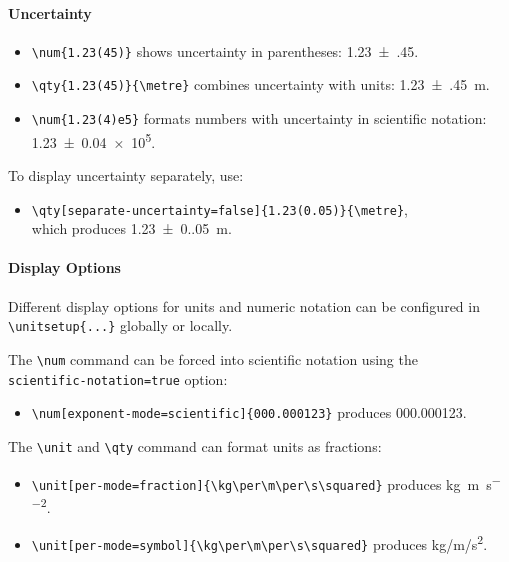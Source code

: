     \paragraph*{Uncertainty}

    \begin{itemize}
        \item \verb|\num{1.23(45)}| shows uncertainty in parentheses: \num{1.23(45)}.
        \item \verb|\qty{1.23(45)}{\metre}| combines uncertainty with units: \qty{1.23(45)}{\metre}.
        \item \verb|\num{1.23(4)e5}| formats numbers with uncertainty in scientific notation: \num{1.23(4)e5}.
    \end{itemize}
    To display uncertainty separately, use:
    \begin{itemize}
        \item \verb|\qty[separate-uncertainty=false]{1.23(0.05)}{\metre}|, \\
        which produces \qty[separate-uncertainty=false]{1.23(0.05)}{\metre}.
    \end{itemize}


    \paragraph*{Display Options}

    Different display options for units and numeric notation can be configured in \\
     \verb|\unitsetup{...}| globally or locally.

    The \verb|\num| command can be forced into scientific notation using the\\
    \verb|scientific-notation=true| option:

    \begin{itemize}
        \item \verb|\num[exponent-mode=scientific]{000.000123}| produces \num[exponent-mode=scientific]{000.000123}.
    \end{itemize}

    The \verb|\unit| and \verb|\qty| command can format units as fractions:
    \begin{itemize}
        \item \verb|\unit[per-mode=fraction]{\kg\per\m\per\s\squared}| produces \unit[per-mode=fraction]{\kg\per\m\per\s\squared}.
        \item \verb|\unit[per-mode=symbol]{\kg\per\m\per\s\squared}| produces \unit[per-mode=symbol]{\kg\per\m\per\s\squared}.
    \end{itemize}


















\endgroup